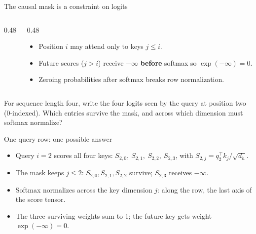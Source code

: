 \documentclass[handout]{beamer}
\begin{document}
\begin{frame}{The causal mask is a constraint on logits}
  \begin{columns}[c]
    \begin{column}{0.48\linewidth}
      \centering
    \end{column}
    \begin{column}{0.48\linewidth}
      \begin{itemize}
          \setlength{\itemsep}{4pt}
        \item Position $i$ may attend only to keys $j \le i$.
        \item Future scores ($j > i$) receive $-\infty$ \textbf{before} softmax so $\exp(-\infty)=0$.
        \item Zeroing probabilities after softmax breaks row normalization.
      \end{itemize}
    \end{column}
  \end{columns}
\end{frame}

{For sequence length four, write the four logits seen by the query at position two (0-indexed). Which entries survive the mask, and across which dimension must softmax normalize?}

\begin{frame}{One query row: one possible answer}
  \begin{itemize}
      \setlength{\itemsep}{9pt}
    \item Query $i=2$ scores all four keys: $S_{2,0},\ S_{2,1},\ S_{2,2},\ S_{2,3}$, with $S_{2,j}=q_2^\top k_j/\sqrt{d_h}$.
    \item The mask keeps $j\le 2$: $S_{2,0},S_{2,1},S_{2,2}$ survive; $S_{2,3}$ receives $-\infty$.
    \item Softmax normalizes across the key dimension $j$: along the row, the last axis of the score tensor.
    \item The three surviving weights sum to 1; the future key gets weight $\exp(-\infty)=0$.
  \end{itemize}
\end{frame}
\end{document}
